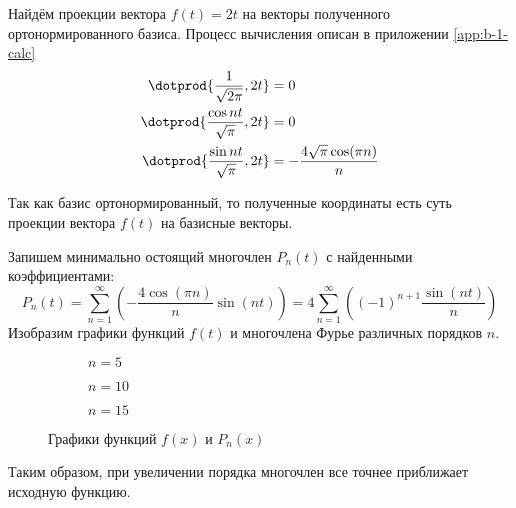 Найдём проекции вектора \(f(t) = 2t\) на векторы полученного
ортонормированного базиса.
Процесс вычисления описан в приложении \ref{app:b-1-calc}
\begin{align*}
  \dotprod{\frac{1}{\sqrt{2\pi}}, 2t} &= 0 \\
  \dotprod{\frac{\cos nt}{\sqrt{\pi}}, 2t} &= 0 \\
  \dotprod{\frac{\sin nt}{\sqrt{\pi}}, 2t}
    &= -\frac{4 \sqrt{\pi} \cos(\pi n)}{n}
\end{align*}

Так как базис ортонормированный,
то полученные координаты есть суть проекции
вектора \(f(t)\) на базисные векторы.

Запишем минимально остоящий многочлен \(P_{n}(t)\)
с найденными коэффициентами:
\[
  P_{n}(t)
  = \sum_{n = 1}^{\infty}
    \left(-\frac{4\cos(\pi n)}{n} \sin(nt)\right)
  = 4 \sum_{n = 1}^{\infty}
    \left({(-1)}^{n + 1} \frac{\sin(nt)}{n}\right)
\]
Изобразим графики функций \(f(t)\) и многочлена Фурье
различных порядков \(n\).

\begin{figure}[!htbp]
  \centering
  \begin{subfigure}{0.32\textwidth}
    \centering
    \caption{\(n = 5\)}
  \end{subfigure}
  \begin{subfigure}{0.32\textwidth}
    \centering
    \caption{\(n = 10\)}
  \end{subfigure}
  \begin{subfigure}{0.32\textwidth}
    \centering
    \caption{\(n = 15\)}
  \end{subfigure}
  \caption{Графики функций \(f(x)\) и \(P_{n}(x)\)}
\end{figure}

Таким образом,
при увеличении порядка многочлен все точнее приближает исходную функцию.
